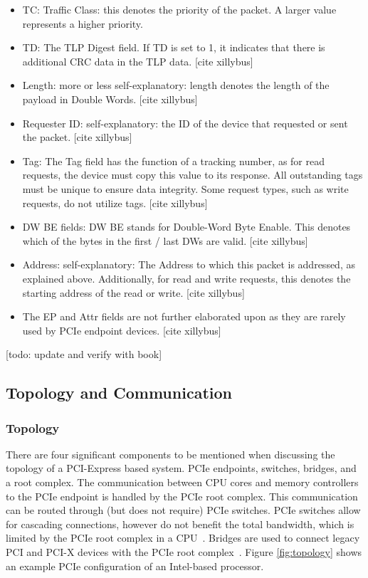 \begin{itemize}
\item TC: Traffic Class: this denotes the priority of the packet. A larger value represents a higher priority.~\cite{jackson_pci_2012}
\item TD: The TLP Digest field. If TD is set to 1, it indicates that there is additional CRC data in the TLP data. [cite xillybus]
\item Length: more or less self-explanatory: length denotes the length of the payload in Double Words. [cite xillybus]
\item Requester ID: self-explanatory: the ID of the device that requested or sent the packet. [cite xillybus]
\item Tag: The Tag field has the function of a tracking number, as for read requests, the device must copy this value to its response. All outstanding tags must be unique to ensure data integrity. Some request types, such as write requests, do not utilize tags. [cite xillybus]
\item DW BE fields: DW BE stands for Double-Word Byte Enable. This denotes which of the bytes in the first / last DWs are valid. [cite xillybus]
\item Address: self-explanatory: The Address to which this packet is addressed, as explained above. Additionally, for read and write requests, this denotes the starting address of the read or write. [cite xillybus]
\item The EP and Attr fields are not further elaborated upon as they are rarely used by PCIe endpoint devices. [cite xillybus]
\end{itemize}

[todo: update and verify with book]

\subsection{Topology and Communication}

\subsubsection{Topology}
There are four significant components to be mentioned when discussing the topology of a PCI-Express based system. PCIe endpoints, switches, bridges, and a root complex. 
The communication between CPU cores and memory controllers to the PCIe endpoint is handled by the PCIe root complex. This communication can be routed through (but does not require) PCIe switches. PCIe switches allow for cascading connections, however do not benefit the total bandwidth, which is limited by the PCIe root complex in a CPU~\cite{nakamura_thorough_2017}.
Bridges are used to connect legacy PCI and PCI-X devices with the PCIe root complex~\cite{pci-sig_pci_2011}.
Figure \ref{fig:topology} shows an example PCIe configuration of an Intel-based processor.

